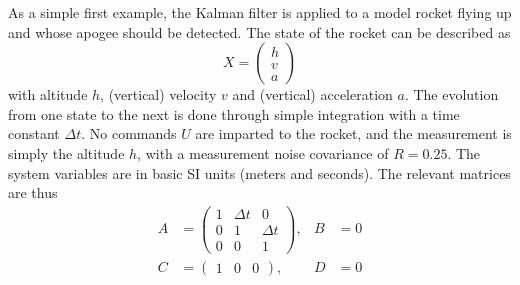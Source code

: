\documentclass[a4paper]{article}
\begin{document}
As a simple first example, the Kalman filter is applied to a model rocket flying up and whose apogee should be detected. The state of the rocket can be described as \begin{equation}X = \begin{pmatrix}h\\v\\a\end{pmatrix}\end{equation}with altitude $h$, (vertical) velocity $v$ and (vertical) acceleration $a$. The evolution from one state to the next is done through simple integration with a time constant $\Delta t$. No commands $U$ are imparted to the rocket, and the measurement is simply the altitude $h$, with a measurement noise covariance of $R=0.25$. The system variables are in basic SI units (meters and seconds). The relevant matrices are thus \begin{align}A&=\begin{pmatrix}1 & \Delta t & 0 \\ 0 & 1 & \Delta t \\ 0 & 0 & 1\end{pmatrix}, &B&=0 \\ C&=\begin{pmatrix}1 & 0 & 0\end{pmatrix}, &D&=0\end{align}
\end{document}
